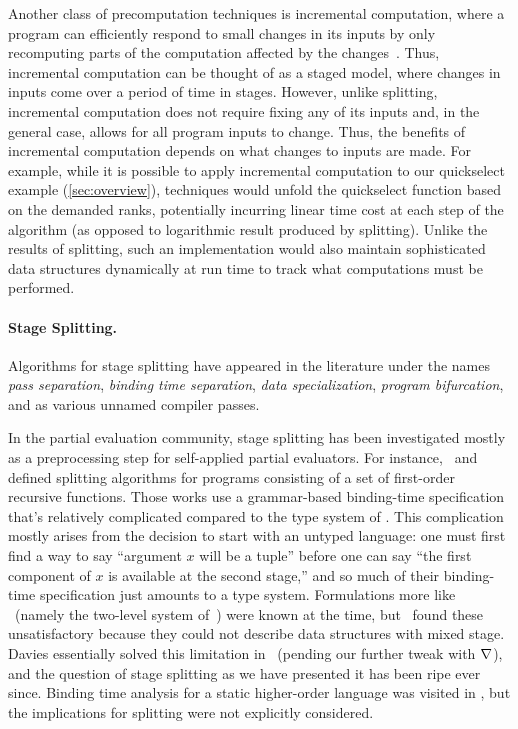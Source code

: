 Another class of precomputation techniques is incremental computation,
where a program can efficiently respond to small changes in its inputs
by only recomputing parts of the computation affected by the
changes~\cite{DemersReTe81,PughTe89,RamalingamRe93,AcarBlBlHaTa09}.
Thus, incremental computation can be thought of as a staged model,
where changes in inputs come over a period of time in stages.
%
However, unlike splitting, incremental computation does not require
fixing any of its inputs and, in the general case, allows for all
program inputs to change. Thus, the benefits of incremental
computation depends on what changes to inputs are made. For example,
while it is possible to apply incremental computation to our
quickselect example (\ref{sec:overview}), techniques would unfold the
quickselect function based on the demanded ranks, potentially
incurring linear time cost at each step of the algorithm (as opposed
to logarithmic result produced by splitting). Unlike the results of
splitting, such an implementation would also maintain sophisticated
data structures dynamically at run time to track what computations
must be performed.

\paragraph{Stage Splitting.}

Algorithms for stage splitting have appeared in the literature under the names 
{\em pass separation}, {\em binding time separation}, {\em data specialization}, 
{\em program bifurcation}, and as various unnamed compiler passes.

In the partial evaluation community, stage splitting has been investigated 
mostly as a preprocessing step for self-applied partial evaluators. 
For instance,~\cite{Mogensen89a} and~\cite{DeNiel91} defined splitting algorithms
for programs consisting of a set of first-order recursive functions.
Those works use a grammar-based binding-time specification that's 
relatively complicated compared to the type system of \lang.
This complication mostly arises from the decision to start with an untyped language:
one must first find a way to say ``argument $x$ will be a tuple'' before one can say
``the first component of $x$ is available at the second stage,'' 
and so much of their binding-time specification just amounts to a type system.
Formulations more like \lang\ (namely the two-level system of~\cite{NN92-twolevel}) were known at the time,
but~\cite{Mogensen89a} found these unsatisfactory because they could not describe data structures with mixed stage.
Davies essentially solved this limitation in~\cite{davies96} (pending our further tweak with $\nabla$),
and the question of stage splitting as we have presented it has been ripe ever since.
Binding time analysis for a static higher-order language was visited in \cite{Mogensen89b},
but the implications for splitting were not explicitly considered.

